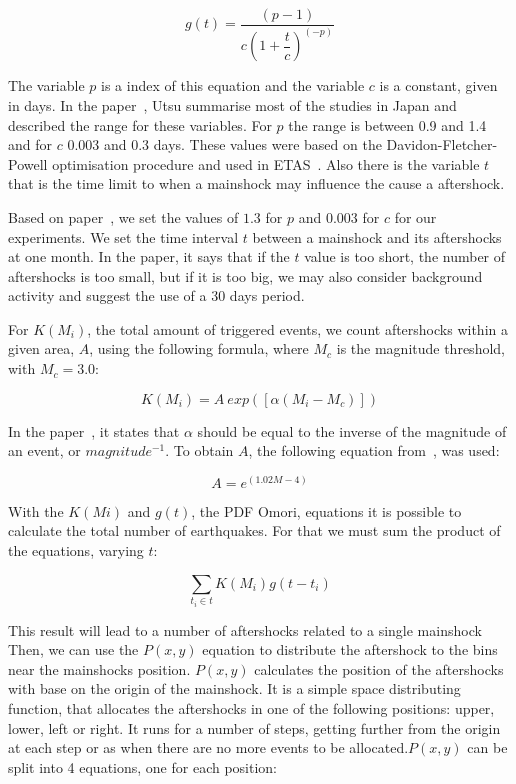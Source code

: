 \begin{equation}\label{omori}
	g(t)= \dfrac{(p-1)}{c(1+ \dfrac{t}{c})^(-p)}
\end{equation}

The variable $p$ is a index of this equation and the variable $c$ is a constant, given in days. In the paper~\cite{utsu1995centenary}, Utsu summarise most of the studies in Japan and described the range for these variables. For $p$ the range is between 0.9 and 1.4 and for $c$ 0.003 and 0.3 days. These values were based on the Davidon-Fletcher-Powell optimisation procedure and used in ETAS~\cite{utsu1995centenary}. Also there is the variable $t$ that is the time limit to when a mainshock may influence the cause a aftershock.

Based on paper~\cite{yamanaka1990scaling}, we set the values of $1.3$ for $p$ and $0.003$ for $c$ for our experiments. We set the time interval $t$ between a mainshock and its aftershocks at one month. In the paper, it says that if the $t$ value is too short, the number of aftershocks is too small, but if it is too big, we may also consider background activity and suggest the use of a 30 days period.

For $K(M_i)$, the total amount of triggered events, we count aftershocks within a given area, $A$, using the following formula, where $M_c$ is the magnitude threshold, with $M_c=3.0$:

\begin{equation}\label{triggered}
 K(M_i) = A\ exp([\alpha(M_i-M_c)])
\end{equation}

In the paper~\cite{ogata2006space}, it states that $\alpha$ should be equal to the inverse of the magnitude of an event, or $magnitude^{-1}$. To obtain $A$, the following equation from~\cite{yamanaka1990scaling}, was used:

\begin{equation}
A = e^{(1.02M -4)}
\end{equation}

With the $K(Mi)$ and $g(t)$, the PDF Omori, equations it is possible to calculate the total number of earthquakes. For that we must sum the product of the equations, varying $t$:

\begin{equation}
\displaystyle\sum_{t_i \in t} K(M_i)g(t-t_i)
\end{equation}

This result will lead to a number of aftershocks related to a single mainshock Then, we can use the $P(x,y)$ equation to distribute the aftershock to the bins near the mainshocks position.  $P(x,y)$ calculates the position of the aftershocks with base on the origin of the mainshock. It is a simple space distributing function, that allocates the aftershocks in one of the following positions: upper, lower, left or right. It runs for a number of steps, getting further from the origin at each step or as when there are no more events to be allocated.$P(x,y)$ can be split into 4 equations, one for each position:

